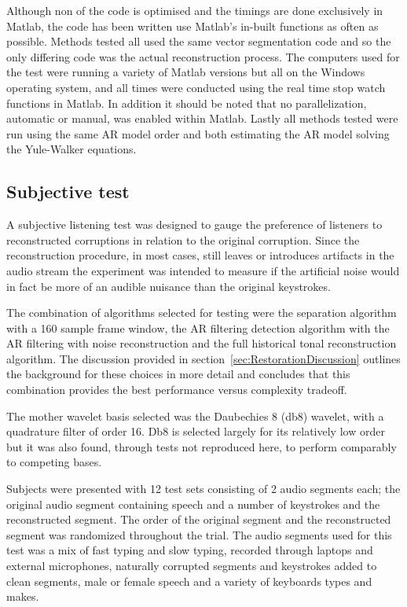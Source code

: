 Although non of the code is optimised and the timings are done exclusively in Matlab, the code has been written use Matlab's in-built functions as often as possible. Methods tested all used the same vector segmentation code and so the only differing code was the actual reconstruction process. The computers used for the test were running a variety of Matlab versions but all on the Windows operating system, and all times were conducted using the real time stop watch functions in Matlab. In addition it should be noted that no parallelization, automatic or manual, was enabled within Matlab. Lastly all methods tested were run using the same AR model order and both estimating the AR model solving the Yule-Walker equations.

\subsection{Subjective test}
A subjective listening test was designed to gauge the preference of listeners to reconstructed corruptions in relation to the original corruption. Since the reconstruction procedure, in most cases, still leaves or introduces artifacts in the audio stream the experiment was intended to measure if the artificial noise would in fact be more of an audible nuisance than the original keystrokes.

The combination of algorithms selected for testing were the separation algorithm with a 160 sample frame window, the AR filtering detection algorithm with the AR filtering with noise reconstruction and the full historical tonal reconstruction algorithm. The discussion provided in section~\ref{sec:RestorationDiscussion} outlines the background for these choices in more detail and concludes that this combination provides the best performance versus complexity tradeoff.

The mother wavelet basis selected was the Daubechies 8 (db8) wavelet\cite{Daubechies1992}, with a quadrature filter of order 16. Db8 is selected largely for its relatively low order but it was also found, through tests not reproduced here, to perform comparably to competing bases.

Subjects were presented with 12 test sets consisting of 2 audio segments each; the original audio segment containing speech and a number of keystrokes and the reconstructed segment. The order of the original segment and the reconstructed segment was randomized throughout the trial. The audio segments used for this test was a mix of fast typing and slow typing, recorded through laptops and external microphones, naturally corrupted segments and keystrokes added to clean segments, male or female speech and a variety of keyboards types and makes.

